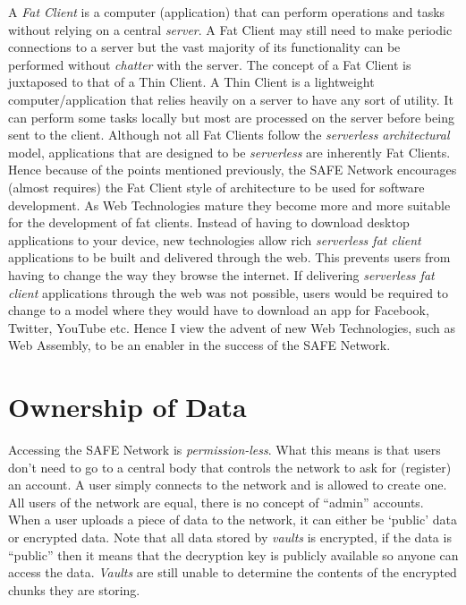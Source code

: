A \textit{Fat Client} is a computer (application) that can perform operations and tasks without relying on a central \textit{server}. A Fat Client may still need to make periodic connections to a server but the vast majority of its functionality can be performed without \textit{chatter} with the server. The concept of a Fat Client is juxtaposed to that of a Thin Client. A Thin Client is a lightweight computer/application that relies heavily on a server to have any sort of utility. It can perform some tasks locally but most are processed on the server before being sent to the client. Although not all Fat Clients follow the \textit{serverless architectural} model, applications that are designed to be \textit{serverless} are inherently Fat Clients. Hence because of the points mentioned previously, the SAFE Network encourages (almost requires) the Fat Client style of architecture to be used for software development. As Web Technologies mature they become more and more suitable for the development of fat clients. Instead of having to download desktop applications to your device, new technologies allow rich \textit{serverless fat client} applications to be built and delivered through the web. This prevents users from having to change the way they browse the internet. If delivering \textit{serverless fat client} applications through the web was not possible, users would be required to change to a model where they would have to download an app for Facebook, Twitter, YouTube etc. Hence I view the advent of new Web Technologies, such as Web Assembly, to be an enabler in the success of the SAFE Network.

\section{Ownership of Data}
\label{sec:ownership-of-data}

Accessing the SAFE Network is \textit{permission-less}. What this means is that users don't need to go to a central body that controls the network to ask for (register) an account. A user simply connects to the network and is allowed to create one. All users of the network are equal, there is no concept of ``admin'' accounts. When a user uploads a piece of data to the network, it can either be `public' data or encrypted data. Note that all data stored by \textit{vaults} is encrypted, if the data is ``public'' then it means that the decryption key is publicly available so anyone can access the data. \textit{Vaults} are still unable to determine the contents of the encrypted chunks they are storing.

